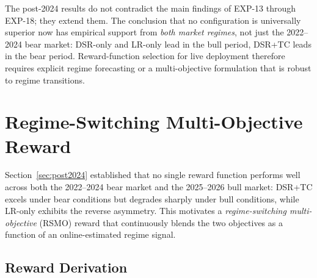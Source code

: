 \documentclass[conference]{IEEEtran}
\begin{document}
The post-2024 results do not contradict the main
findings of EXP-13 through EXP-18; they extend them.
The conclusion that no configuration is universally
superior now has empirical support from \emph{both
market regimes}, not just the 2022--2024 bear market:
DSR-only and LR-only lead in the bull period, DSR+TC
leads in the bear period. Reward-function selection
for live deployment therefore requires explicit
regime forecasting or a multi-objective formulation
that is robust to regime transitions.

\section{Regime-Switching Multi-Objective Reward}
\label{sec:rsmo}

Section~\ref{sec:post2024} established that no single reward function
performs well across both the 2022--2024 bear market and the 2025--2026
bull market: DSR+TC excels under bear conditions but degrades sharply
under bull conditions, while LR-only exhibits the reverse asymmetry.
This motivates a \emph{regime-switching multi-objective} (RSMO) reward
that continuously blends the two objectives as a function of an
online-estimated regime signal.

\subsection{Reward Derivation}
\label{sec:rsmo_derivation}
\end{document}
